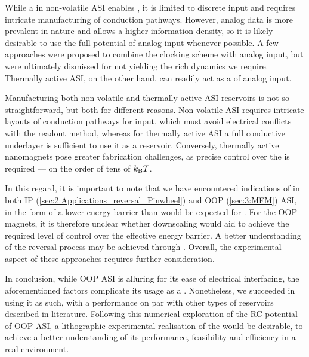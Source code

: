 While a  in non-volatile ASI enables , it is limited to discrete input and requires intricate manufacturing of conduction pathways.
However, analog data is more prevalent in nature and allows a higher information density, so it is likely desirable to use the full potential of analog input whenever possible.
A few approaches were proposed to combine the clocking scheme with analog input, but were ultimately dismissed for not yielding the rich dynamics we require.
Thermally active ASI, on the other hand, can readily act as a  of analog input. \par
Manufacturing both non-volatile and thermally active ASI reservoirs is not so straightforward, but both for different reasons.
Non-volatile ASI requires intricate layouts of conduction pathways for input, which must avoid electrical conflicts with the readout method, whereas for thermally active ASI a full conductive underlayer is sufficient to use it as a reservoir.
Conversely, thermally active nanomagnets pose greater fabrication challenges, as precise control over the  is required --- on the order of tens of $\kBT$. \par
In this regard, it is important to note that we have encountered indications of  in both IP (\cref{sec:2:Applications_reversal_Pinwheel}) and OOP (\cref{sec:3:MFM}) ASI, in the form of a lower energy barrier than would be expected for .
For the OOP magnets, it is therefore unclear whether downscaling would aid to achieve the required level of control over the effective energy barrier.
A better understanding of the reversal process may be achieved through .
Overall, the experimental aspect of these approaches requires further consideration. \\\par

In conclusion, while OOP ASI is alluring for its ease of electrical interfacing, the aforementioned factors complicate its usage as a .
Nonetheless, we succeeded in using it as such, with a performance on par with other types of reservoirs described in literature.
Following this numerical exploration of the RC potential of OOP ASI, a lithographic experimental realisation of the  would be desirable, to achieve a better understanding of its performance, feasibility and efficiency in a real environment.


